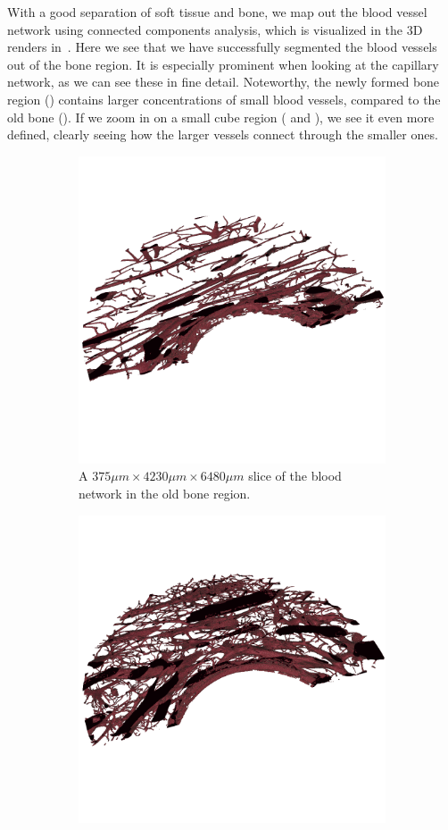 With a good separation of soft tissue and bone, we map out the blood vessel
network using connected components analysis, which is visualized in the 3D
renders in~. Here we see that we have successfully
segmented the blood vessels out of the bone region. It is especially prominent
when looking at the capillary network, as we can see these in fine detail.
Noteworthy, the newly formed bone region () contains
larger concentrations of small blood vessels, compared to the old bone
(). If we zoom in on a small cube region
( and ), we see it even more
defined, clearly seeing how the larger vessels connect through the smaller
ones.

\begin{figure}
    \centering
    \begin{subfigure}[b]{\linewidth}
    \centering
        \includegraphics[width=.7\linewidth]{generated/figure10_old_bone.png}
        \caption{A $375\mu m \times 4230\mu m \times 6480\mu m$ slice of the blood network in the old bone region.}
        \label{fig:blood-old-slice}
    \end{subfigure}
    \begin{subfigure}[b]{\linewidth}
    \centering
        \includegraphics[width=.7\linewidth]{generated/figure10_new_bone.png}

\end{subfigure}
\end{figure}
